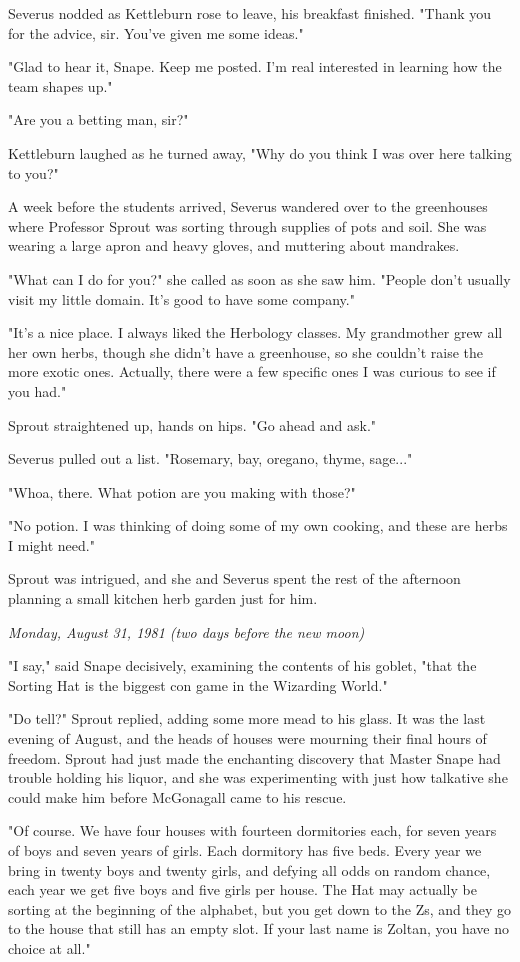 \documentclass[a4paper,11pt]{article}
\begin{document}
Severus nodded as Kettleburn rose to leave, his breakfast finished. "Thank you for the advice, sir. You've given me some ideas."

"Glad to hear it, Snape. Keep me posted. I'm real interested in learning how the team shapes up."

"Are you a betting man, sir?"

Kettleburn laughed as he turned away, "Why do you think I was over here talking to you?"

A week before the students arrived, Severus wandered over to the greenhouses where Professor Sprout was sorting through supplies of pots and soil. She was wearing a large apron and heavy gloves, and muttering about mandrakes.

"What can I do for you?" she called as soon as she saw him. "People don't usually visit my little domain. It's good to have some company."

"It's a nice place. I always liked the Herbology classes. My grandmother grew all her own herbs, though she didn't have a greenhouse, so she couldn't raise the more exotic ones. Actually, there were a few specific ones I was curious to see if you had."

Sprout straightened up, hands on hips. "Go ahead and ask."

Severus pulled out a list. "Rosemary, bay, oregano, thyme, sage..."

"Whoa, there. What potion are you making with those?"

"No potion. I was thinking of doing some of my own cooking, and these are herbs I might need."

Sprout was intrigued, and she and Severus spent the rest of the afternoon planning a small kitchen herb garden just for him.

\emph{Monday, August 31, 1981 (two days before the new moon)}

"I say," said Snape decisively, examining the contents of his goblet, "that the Sorting Hat is the biggest con game in the Wizarding World."

"Do tell?" Sprout replied, adding some more mead to his glass. It was the last evening of August, and the heads of houses were mourning their final hours of freedom. Sprout had just made the enchanting discovery that Master Snape had trouble holding his liquor, and she was experimenting with just how talkative she could make him before McGonagall came to his rescue.

"Of course. We have four houses with fourteen dormitories each, for seven years of boys and seven years of girls. Each dormitory has five beds. Every year we bring in twenty boys and twenty girls, and defying all odds on random chance, each year we get five boys and five girls per house. The Hat may actually be sorting at the beginning of the alphabet, but you get down to the Zs, and they go to the house that still has an empty slot. If your last name is Zoltan, you have no choice at all."
\end{document}

